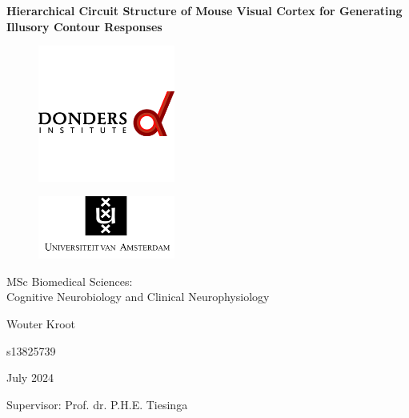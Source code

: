 \documentclass[12pt]{article}
\begin{document}
\captionsetup{font=small}

\begin{titlepage}
\centering

{\LARGE\bfseries Hierarchical Circuit Structure of Mouse Visual Cortex for Generating Illusory Contour Responses\par}


  
\begin{figure}[h]
  \centering
  \includegraphics[width=0.4\textwidth]{figures/donders_logo.png}
\end{figure}

\vspace{-1.5cm}
\begin{figure}[h]
  \centering
  \includegraphics[width=0.4\textwidth]{figures/uva_logo.png}
\end{figure}

\begin{center}
  \large{MSc Biomedical Sciences:\\
  Cognitive Neurobiology and Clinical Neurophysiology}
\end{center}

\vspace{10pt} %

{\large Wouter Kroot\par}
{\large s13825739 \par}
\vspace{10pt} %
{\large July 2024\par}
\vspace{5pt}
{\large Supervisor: Prof. dr. P.H.E. Tiesinga}

\end{titlepage}
\end{document}
